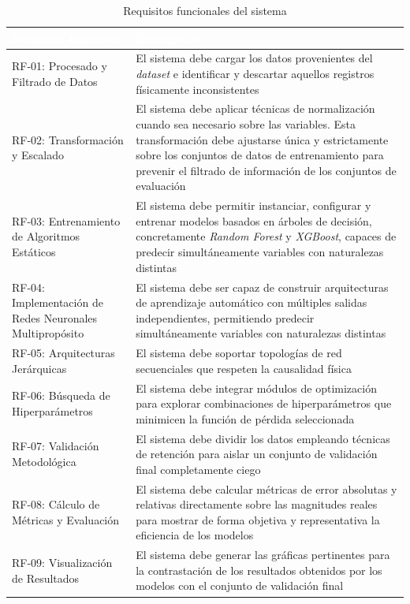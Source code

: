 \begin{table}[htp]
	\centering
	\renewcommand{\arraystretch}{1.3}
		\begin{tabular}{ | m{7cm} | m{8cm} | }
			\hline
			\rowcolor[HTML]{5B9BD5} 
			\textcolor{white}{\textbf{Requisito Funcional}} & \textcolor{white}{\textbf{Descripción}}\\
			\hline
			
			RF-01: Procesado y Filtrado de Datos & El sistema debe cargar los datos provenientes del \textit{dataset} e identificar y descartar aquellos registros físicamente inconsistentes \\
			\hline
			RF-02: Transformación y Escalado & El sistema debe aplicar técnicas de normalización cuando sea necesario sobre las variables. Esta transformación debe ajustarse única y estrictamente sobre los conjuntos de datos de entrenamiento para prevenir el filtrado de información de los conjuntos de evaluación \\
			\hline
			RF-03: Entrenamiento de Algoritmos Estáticos & El sistema debe permitir instanciar, configurar y entrenar modelos basados en árboles de decisión, concretamente \textit{Random Forest} y \textit{XGBoost}, capaces de predecir simultáneamente variables con naturalezas distintas \\
			\hline 
			RF-04: Implementación de Redes Neuronales Multipropósito & El sistema debe ser capaz de construir arquitecturas de aprendizaje automático con múltiples salidas independientes, permitiendo predecir simultáneamente variables con naturalezas distintas \\
			\hline
			RF-05: Arquitecturas Jerárquicas & El sistema debe soportar topologías de red secuenciales que respeten la causalidad física \\
			\hline
			RF-06: Búsqueda de Hiperparámetros & El sistema debe integrar módulos de optimización para explorar combinaciones de hiperparámetros que minimicen la función de pérdida seleccionada \\
			\hline
			RF-07: Validación Metodológica & El sistema debe dividir los datos empleando técnicas de retención para aislar un conjunto de validación final completamente ciego \\
			\hline
			RF-08: Cálculo de Métricas y Evaluación & El sistema debe calcular métricas de error absolutas y relativas directamente sobre las magnitudes reales para mostrar de forma objetiva y representativa la eficiencia de los modelos \\
			\hline
			RF-09: Visualización de Resultados & El sistema debe generar las gráficas pertinentes para la contrastación de los resultados obtenidos por los modelos con el conjunto de validación final \\
			\hline
			
		\end{tabular} 
		
		\caption{Requisitos funcionales del sistema}
	\end{table}